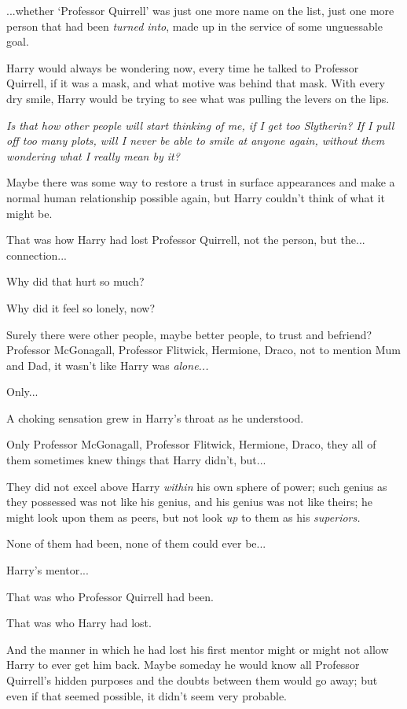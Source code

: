 ...whether `Professor Quirrell' was just one more name on the list,
just one more person that had been \emph{turned into}, made up in the
service of some unguessable goal.

Harry would always be wondering now, every time he talked to Professor
Quirrell, if it was a mask, and what motive was behind that mask. With
every dry smile, Harry would be trying to see what was pulling the
levers on the lips.

\emph{Is that how other people will start thinking of me, if I get too
Slytherin? If I pull off too many plots, will I never be able to smile
at anyone again, without them wondering what I really mean by it?}

Maybe there was some way to restore a trust in surface appearances and
make a normal human relationship possible again, but Harry couldn't
think of what it might be.

That was how Harry had lost Professor Quirrell, not the person, but
the... connection...

Why did that hurt so much?

Why did it feel so lonely, now?

Surely there were other people, maybe better people, to trust and
befriend? Professor McGonagall, Professor Flitwick, Hermione, Draco, not
to mention Mum and Dad, it wasn't like Harry was \emph{alone...}

Only...

A choking sensation grew in Harry's throat as he understood.

Only Professor McGonagall, Professor Flitwick, Hermione, Draco, they all
of them sometimes knew things that Harry didn't, but...

They did not excel above Harry \emph{within} his own sphere of power;
such genius as they possessed was not like his genius, and his genius
was not like theirs; he might look upon them as peers, but not look
\emph{up} to them as his \emph{superiors.}

None of them had been, none of them could ever be...

Harry's mentor...

That was who Professor Quirrell had been.

That was who Harry had lost.

And the manner in which he had lost his first mentor might or might not
allow Harry to ever get him back. Maybe someday he would know all
Professor Quirrell's hidden purposes and the doubts between them would
go away; but even if that seemed possible, it didn't seem very probable.

